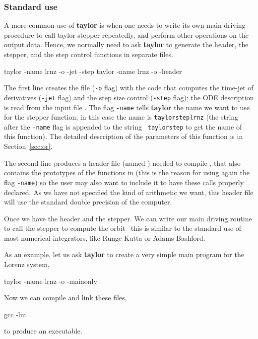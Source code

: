 \documentclass[10pt]{article}
\theoremstyle{remark}
\newcommand{\taylorname}{{\bf taylor}}
\newcommand{\inputfile}{}
\newcommand{\mainfile}{}
\newcommand{\odecfile}{}
\newcommand{\odehfile}{}
\begin{document}
\subsubsection*{Standard use}
A more common use of \taylorname{} is when one needs to write its own
main driving procedure to call taylor stepper repeatedly, and perform
other operations on the output data. Hence, we normally need to ask
\taylorname{} to generate the header, the stepper, and the step
control functions in separate files.
\begin{command}
   taylor -name lrnz -o \odecfile{} -jet -step \inputfile{}
   taylor -name lrnz -o \odehfile{} -header \inputfile{}
\end{command}
The first line creates the file \odecfile{} ({\tt -o} flag) with the
code that computes the time-jet of derivatives ({\tt -jet} flag) and
the step size control ({\tt -step} flag); the ODE description is read
from the input file \inputfile{}. The flag {\tt -name} tells
\taylorname{} the name we want to use for the stepper function; in
this case the name is {\tt taylorsteplrnz} (the
string after the {\tt -name} flag is appended to the string {\tt
  taylorstep} to get the name of this
function). The detailed description of the parameters of this function
is in Section~\ref{sec:or}.

The second line produces a header file (named \odehfile{}) needed to
compile \odecfile{}, that also contains the prototypes of the
functions in \odecfile{} (this is the reason for using again the flag
{\tt -name}) so the user may also want to include it to have these
calls properly declared. As we have not specified the kind of
arithmetic we want, this header file will use the standard double
precision of the computer.

\smallskip

Once we have the header and the stepper. We can write our main driving
routine to call the stepper to compute the orbit --this is similar to
the standard use of most numerical integrators, like Runge-Kutta or
Adams-Bashford.

\smallskip

As an example, let us ask \taylorname{} to create a very simple main
program for the Lorenz system,
\begin{command}
   taylor -name lrnz -o \mainfile{} -mainonly \inputfile{}
\end{command}
Now we can compile and link these files,
\begin{command}
   gcc  \mainfile{} \odecfile{} -lm
\end{command}
to produce an executable. 
\end{document}
